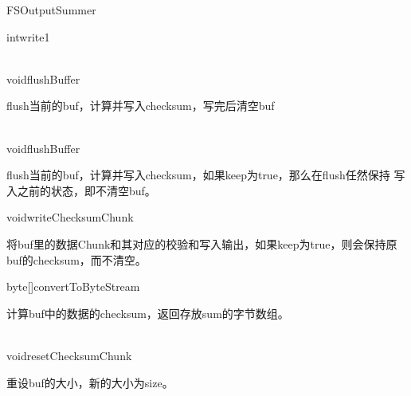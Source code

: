 \begin{XeClass}{FSOutputSummer}
\begin{XeMethod}{\XePrivate}{int}{write1}
    \end{XeMethod}

    \begin{XeMethod}{\XeProtected \\ \XeSync}{void}{flushBuffer}
         
 flush当前的buf，计算并写入checksum，写完后清空buf

    \end{XeMethod}

    \begin{XeMethod}{\XeProtected \\ \XeSync}{void}{flushBuffer}
         
 flush当前的buf，计算并写入checksum，如果keep为true，那么在flush任然保持
 写入之前的状态，即不清空buf。

    \end{XeMethod}

    \begin{XeMethod}{\XePrivate}{void}{writeChecksumChunk}
         
 将buf里的数据Chunk和其对应的校验和写入输出，如果keep为true，则会保持原
 buf的checksum，而不清空。

    \end{XeMethod}

    \begin{XeMethod}{\XePublic}{byte[]}{convertToByteStream}
         
 计算buf中的数据的checksum，返回存放sum的字节数组。

    \end{XeMethod}

    \begin{XeMethod}{\XeProtected \\ \XeSync}{void}{resetChecksumChunk}
         
 重设buf的大小，新的大小为size。

    \end{XeMethod}

\end{XeClass}
